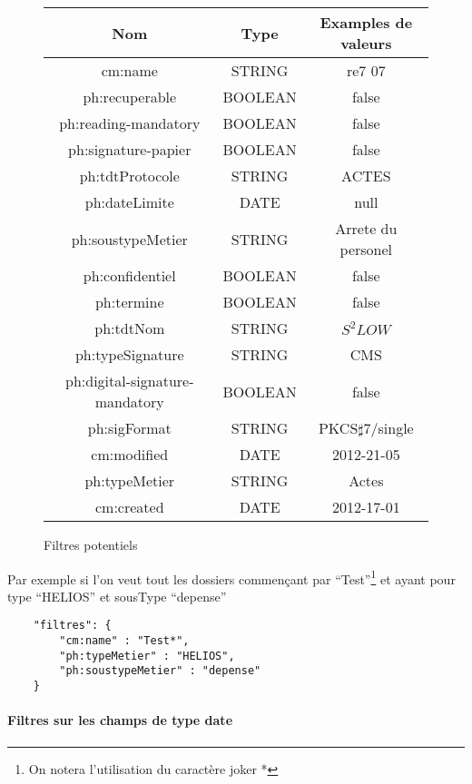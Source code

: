 \begin{figure}[H]
	\begin{center}
\begin{tabular}{c|c|c}
	\hline
	Nom & Type & Examples de valeurs \\
	\hline
	cm:name & STRING & re7 07\\
	ph:recuperable & BOOLEAN & false \\
	ph:reading-mandatory & BOOLEAN & false\\
	ph:signature-papier & BOOLEAN & false\\
	ph:tdtProtocole & STRING  & ACTES\\
	ph:dateLimite & DATE & null\\
	ph:soustypeMetier & STRING & Arrete du personel \\
	ph:confidentiel & BOOLEAN & false \\
	ph:termine & BOOLEAN & false \\
	ph:tdtNom & STRING & $S^2LOW$ \\
	ph:typeSignature & STRING & CMS\\
	ph:digital-signature-mandatory & BOOLEAN & false \\
	ph:sigFormat & STRING & PKCS$\sharp$7/single \\
	cm:modified & DATE & 2012-21-05 \\
	ph:typeMetier & STRING & Actes \\
	cm:created & DATE & 2012-17-01
	
\end{tabular}
\end{center}
\caption{Filtres potentiels}
\label{table:filterable_fields}

\end{figure}

Par exemple si l'on veut tout les dossiers commençant par ``Test''\footnote{On notera l'utilisation du caractère joker *} et ayant pour type ``HELIOS'' et sousType ``depense''
\begin{codesnippet}
\begin{verbatim}
	"filtres": {
		"cm:name" : "Test*",
		"ph:typeMetier" : "HELIOS",
		"ph:soustypeMetier" : "depense"
	}
\end{verbatim}
\caption{Exemple de filtre à prédicats multiples}
\end{codesnippet}


\paragraph{Filtres sur les champs de type date}

